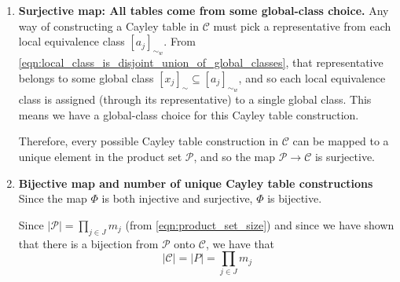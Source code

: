 \begin{proofE}
\begin{enumerate}[(1)]
    \item \textbf{Surjective map: All tables come from some global-class choice.}
    Any way of constructing a Cayley table in $\mathscr{C}$ must pick a representative from each local equivalence class $[a_{j}]_{\sim_{w}}$.
    From \cref{eqn:local_class_is_disjoint_union_of_global_classes}, that representative belongs to some global class $[x_{j}]_{\sim} \subseteq [a_{j}]_{\sim_{w}}$, and so each local equivalence class is assigned (through its representative) to a single global class.
    This means we have a global-class choice for this Cayley table construction.

    Therefore, every possible Cayley table construction in $\mathscr{C}$ can be mapped to a unique element in the product set $\mathcal{P}$, and so the map $\mathcal{P} \to \mathcal{C}$ is surjective.

    \item \textbf{Bijective map and number of unique Cayley table constructions}
    Since the map $\Phi$ is both injective and surjective, $\Phi$ is bijective.

    Since $|\mathcal{P}| = \prod_{j \in J} m_{j}$ (from \cref{eqn:product_set_size}) and since we have shown that there is a bijection from $\mathcal{P}$ onto $\mathcal{C}$, we have that
    \begin{equation}
        |\mathcal{C}| = |P| = \prod_{j \in J} m_{j}
    \end{equation}
\end{enumerate}
\end{proofE}


